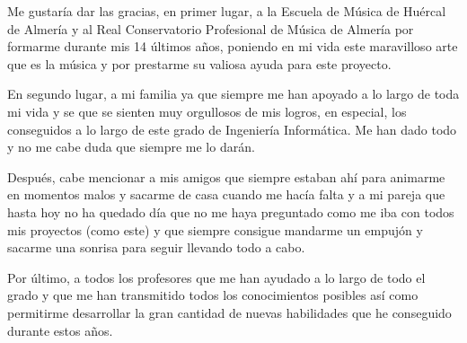 Me gustaría dar las gracias, en primer lugar, a la Escuela de Música de Huércal de Almería y al Real Conservatorio Profesional de Música de Almería por formarme durante mis 14 últimos años, poniendo en mi vida este maravilloso arte que es la música y por prestarme su valiosa ayuda para este proyecto.

En segundo lugar, a mi familia ya que siempre me han apoyado a lo largo de toda mi vida y se que se sienten muy orgullosos de mis logros, en especial, los conseguidos a lo largo de este grado de Ingeniería Informática. Me han dado todo y no me cabe duda que siempre me lo darán.

Después, cabe mencionar a mis amigos que siempre estaban ahí para animarme en momentos malos y sacarme de casa cuando me hacía falta y a mi pareja que hasta hoy no ha quedado día que no me haya preguntado como me iba con todos mis proyectos (como este) y que siempre consigue mandarme un empujón y sacarme una sonrisa para seguir llevando todo a cabo.

Por último, a todos los profesores que me han ayudado a lo largo de todo el grado y que me han transmitido todos los conocimientos posibles así como permitirme desarrollar la gran cantidad de nuevas habilidades que he conseguido durante estos años.
